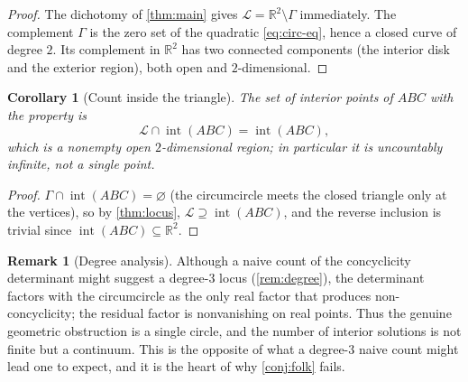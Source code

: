 \documentclass[11pt,a4paper]{article}
\newtheorem{corollary}[theorem]{Corollary}
\theoremstyle{definition}
\newtheorem{remark}[theorem]{Remark}
\newcommand{\R}{\mathbb{R}}
\newcommand{\circc}{\Gamma}
\begin{document}
\begin{proof}
The dichotomy of \cref{thm:main} gives $\mathcal{L}=\R^{2}\setminus\circc$ immediately. The complement $\circc$ is the zero set of the quadratic \cref{eq:circ-eq}, hence a closed curve of degree $2$. Its complement in $\R^{2}$ has two connected components (the interior disk and the exterior region), both open and $2$-dimensional.
\end{proof}

\begin{corollary}[Count inside the triangle]\label{cor:count}
The set of interior points of $ABC$ with the property is
\begin{equation}\label{eq:interior-locus}
\mathcal{L}\cap\operatorname{int}(ABC)=\operatorname{int}(ABC),
\end{equation}
which is a nonempty open $2$-dimensional region; in particular it is uncountably infinite, \emph{not} a single point.
\end{corollary}
\begin{proof}
$\circc\cap\operatorname{int}(ABC)=\varnothing$ (the circumcircle meets the closed triangle only at the vertices), so by \cref{thm:locus}, $\mathcal{L}\supseteq\operatorname{int}(ABC)$, and the reverse inclusion is trivial since $\operatorname{int}(ABC)\subseteq\R^{2}$.
\end{proof}

\begin{remark}[Degree analysis]\label{rem:deg-analysis}
Although a naive count of the concyclicity determinant might suggest a degree-$3$ locus (\cref{rem:degree}), the determinant factors with the circumcircle as the only real factor that produces non-concyclicity; the residual factor is nonvanishing on real points. Thus the genuine geometric obstruction is a single circle, and the number of interior solutions is not finite but a continuum. This is the opposite of what a degree-$3$ naive count might lead one to expect, and it is the heart of why \cref{conj:folk} fails.
\end{remark}
\end{document}
